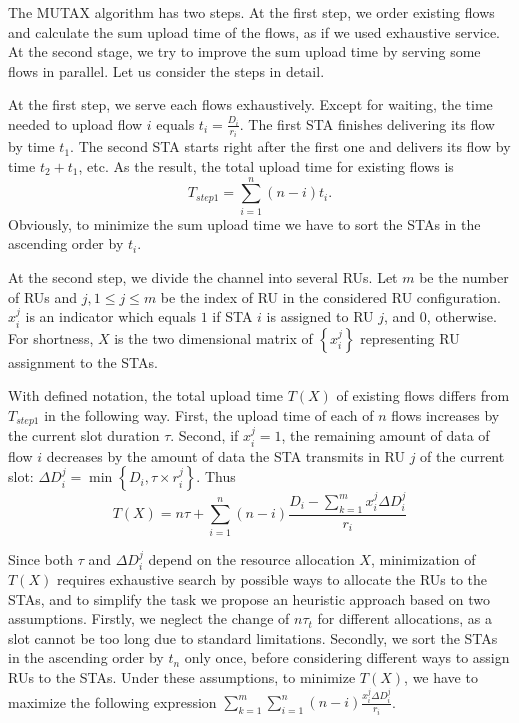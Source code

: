 The MUTAX algorithm has two steps. At the first step, we order existing flows and calculate the sum upload time of the flows, as if we used exhaustive service.
At the second stage, we try to improve the sum upload time by serving some flows in parallel.
Let us consider the steps in detail.

At the first step, we serve each flows exhaustively.
Except for waiting, the time needed to upload flow $i$ equals $t_i = \frac{D_i}{r_{i}}$. %
The first STA finishes delivering its flow by time $t_1$.
The second STA starts right after the first one and delivers its flow by time $t_2 + t_1$, etc.
As the result, the total upload time for existing flows is
\[ T_{step1} = \sum_{i = 1}^{n} \left(n - i\right) t_i. \]
Obviously, to minimize the sum upload time we have to sort the STAs in the ascending order by $t_i$.

At the second step, we divide the channel into several RUs.   
Let $m$ be the number of RUs and $j, 1\le j \le m$ be the index of RU in the considered RU configuration.  
$x_i^j$ is an indicator which equals $1$ if STA $i$ is assigned to RU $j$, and $0$, otherwise.
For shortness, $X$ is the two dimensional matrix of $\left\{x_i^j\right\}$ representing RU assignment to the STAs. 

With defined notation, the total upload time $T\left(X\right) $ of existing flows differs from $T_{step1}$ in the following way. First, the upload time of each of $n$ flows increases by  the current slot duration $\tau$. Second, if $x_i^j=1$, the remaining amount of data of flow $i$ decreases by the amount of data the STA transmits in RU $j$ of the current slot: $\Delta D_i^j = \min\left\{D_i, \tau \times r_{i}^{j}\right\}$. Thus  
\[ T\left(X\right) = n \tau + \sum_{i = 1}^{n} \left(n - i\right) \frac{D_i -  \sum_{k = 1}^{m} x_i^j \Delta D_i^j}{r_{i}} \]



Since both $\tau$ and  $\Delta D_i^j$ depend on the resource allocation $X$, minimization of $T(X)$ requires exhaustive search by possible ways to allocate the RUs to the STAs, and to simplify the task we propose an heuristic approach based on two assumptions.
Firstly, we neglect the change of $n \tau_t$ for different allocations, as a slot cannot be too long due to standard limitations.
Secondly, we sort the STAs in the ascending order by $t_n$ only once, before considering different ways to assign RUs to the STAs.
Under these assumptions, to minimize  $T(X)$, we have to maximize the following expression $\sum_{k = 1}^{m} \sum_{i = 1}^{n } \left(n - i\right) \frac{x_i^j \Delta D_i^j}{r_{i}}$.

